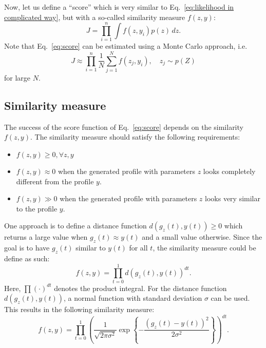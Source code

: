 \documentclass[10pt,final,a4paper,oneside,onecolumn]{article}
\theoremstyle{plain}\newtheorem{definition}{Definition}[section]    %
\theoremstyle{definition}\newtheorem{example}{Example}[section]     %
\theoremstyle{remark}\newtheorem{remarkenv}{Remark}[section]        %
\begin{document}
Now, let us define a ``score'' which is very similar to Eq.~\eqref{eq:likelihood in complicated way}, but with a so-called similarity measure $f(z,y)$:
\begin{equation} \label{eq:score}
	J = \prod_{i=1}^n \int f(z,y_i)p(z) \,dz.
\end{equation}
Note that Eq.~\eqref{eq:score} can be estimated using a Monte Carlo approach, i.e.
\begin{equation} \label{eq:score monte carlo}
	J \approx \prod_{i=1}^n \frac{1}{N} \sum_{j=1}^N f(z_j, y_i), \quad z_j \sim p(Z)
\end{equation}
for large $N$.

\subsection{Similarity measure}
\label{sec:method similarity function}

The success of the score function of Eq.~\eqref{eq:score} depends on the similarity $f(z,y)$. The similarity measure should satisfy the following requirements:
\begin{itemize}
	\item $f(z,y) \geq 0, \forall z, y$
	\item $f(z,y) \approx 0$ when the generated profile with parameters $z$ looks completely different from the profile $y$.
	\item $f(z,y) \gg 0$ when the generated profile with parameters $z$ looks very similar to the profile $y$.
\end{itemize}

One approach is to define a distance function $d(g_z(t), y(t)) \geq 0$ which returns a large value when $g_z(t) \approx y(t)$ and a small value otherwise. Since the goal is to have $g_z(t)$ similar to $y(t)$ for all $t$, the similarity measure could be define as such:
\begin{equation}
	f(z,y) = \prod_{t=0}^{1} d(g_z(t), y(t))^{dt}.
\end{equation}
Here, $\prod (\cdot)^{dt}$ denotes the product integral. For the distance function $d(g_z(t), y(t))$, a normal function with standard deviation $\sigma$ can be used. This results in the following similarity measure:
\begin{equation} \label{eq:similarity measure normal function}
	f(z,y) = \prod_{t=0}^{1} \left( \frac{1}{\sqrt{2\pi\sigma^2}} \exp \left\{ -\frac{(g_z(t)-y(t))^2}{2\sigma^2} \right\} \right)^{dt}.
\end{equation}
\end{document}
